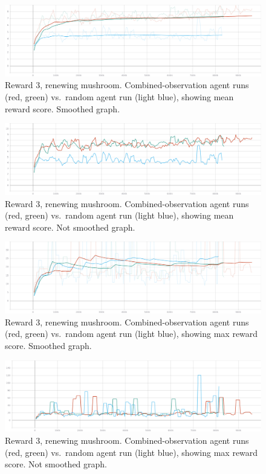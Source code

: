 \documentclass[]{article}
\begin{document}
\begin{figure}
\centering
\includegraphics{./img/114086669-2f982480-98b3-11eb-91db-ff7f9dbdc092.png}
\caption{Reward 3, renewing mushroom. Combined-observation agent runs
(red, green) vs.~random agent run (light blue), showing mean reward
score. Smoothed graph.}
\end{figure}

\begin{figure}
\centering
\includegraphics{./img/114086692-3757c900-98b3-11eb-9956-8999f0431ddf.png}
\caption{Reward 3, renewing mushroom. Combined-observation agent runs
(red, green) vs.~random agent run (light blue), showing mean reward
score. Not smoothed graph.}
\end{figure}

\begin{figure}
\centering
\includegraphics{./img/114086784-57878800-98b3-11eb-97db-628db56a8d7d.png}
\caption{Reward 3, renewing mushroom. Combined-observation agent runs
(red, green) vs.~random agent run (light blue), showing max reward
score. Smoothed graph.}
\end{figure}

\begin{figure}
\centering
\includegraphics{./img/114086807-63734a00-98b3-11eb-9dfb-ed7871c8f18a.png}
\caption{Reward 3, renewing mushroom. Combined-observation agent runs
(red, green) vs.~random agent run (light blue), showing max reward
score. Not smoothed graph.}
\end{figure}
\end{document}
